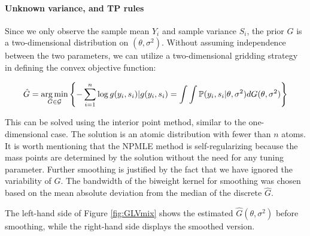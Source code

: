 \documentclass[12pt]{article}
\begin{document}
\paragraph{Unknown variance, and TP rules}

Since we only observe the sample mean $Y_i$ and sample variance $S_i$, the
prior $G$ is a two-dimensional distribution on $(\theta,\sigma^2)$. Without
assuming independence between the two parameters, we can utilize a
two-dimensional gridding strategy in defining the convex objective function:

\begin{equation*}
    \hat{G}=\operatorname*{arg\,min}_{G\in \mathcal{G}} \left\{-\sum_{i=1}^{n}\log g(y_i,s_i)|g(y_i,s_i)=\int \int  \mathbb{P}(y_i,s_i |\theta,\sigma^2)dG(\theta,\sigma^2) \right\}
\end{equation*}

This can be solved using the interior point method, similar to the
one-dimensional case. The solution is an atomic distribution with fewer than
$n$ atoms. It is worth mentioning that the NPMLE method is self-regularizing
because the mass points are determined by the solution without the need for any
tuning parameter. Further smoothing is justified by the fact that we have
ignored the variability of $G$. The bandwidth of the biweight kernel for
smoothing was chosen based on the mean absolute deviation from the median of
the discrete $\hat{G}$.

The left-hand side of Figure \ref{fig:GLVmix} shows the estimated
$\hat{G}(\theta, \sigma^2)$ before smoothing, while the right-hand side
displays the smoothed version.
\end{document}
